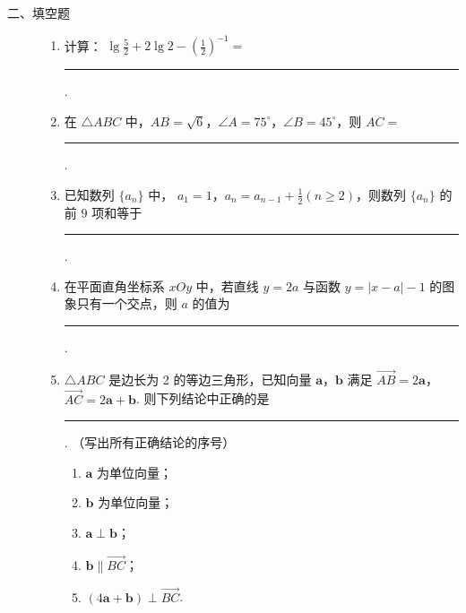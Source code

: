 \begin{description}

    \item[二、填空题]

    \begin{enumerate}[leftmargin=5pt]

      \addtocounter{enumi}{+10}

        \item 计算： \( \lg\frac{5}{2}+2\lg2-\left(\frac{1}{2}\right)^{-1}=\)\rule[-0.3ex]{3em}{0.4pt}.

        \item 在 \(\triangle ABC\) 中，\(AB = \sqrt{6}\)，\(\angle A = 75^{\circ}\)，\(\angle B = 45^{\circ}\)，则 \(AC =\)\rule[-0.3ex]{3em}{0.4pt}.

        \item 已知数列 \( \{a_{n}\} \) 中， \(a_{1}=1\)，\(a_{n}=a_{n-1}+\frac{1}{2}\left(n\geqslant2\right)\)，则数列 \( \{a_{n}\} \) 的前 \(9\) 项和等于\rule[-0.3ex]{3em}{0.4pt}.

        \item 在平面直角坐标系 \(xOy\) 中，若直线 \(y = 2a\) 与函数 \(y = |x - a| - 1\) 的图象只有一个交点，则 \(a\) 的值为\rule[-0.3ex]{3em}{0.4pt}.

        \item \(\triangle ABC\) 是边长为 2 的等边三角形，已知向量 \(\bm{a}\)，\(\bm{b}\) 满足 \(\overrightarrow{AB} = 2\bm{a}\)，\(\overrightarrow{AC} = 2\bm{a} + \bm{b}\). 则下列结论中正确的是\rule[-0.3ex]{3em}{0.4pt}. （写出所有正确结论的序号）

\begin{enumerate}
\item \(\bm{a}\) 为单位向量；
\item \(\bm{b}\) 为单位向量；
\item \(\bm{a} \perp \bm{b}\)；
\item \(\bm{b} \parallel \overrightarrow{BC}\)；
\item \(\left(4\bm{a} + \bm{b}\right) \perp \overrightarrow{BC}\).
\end{enumerate}

    \end{enumerate}

\end{description}

